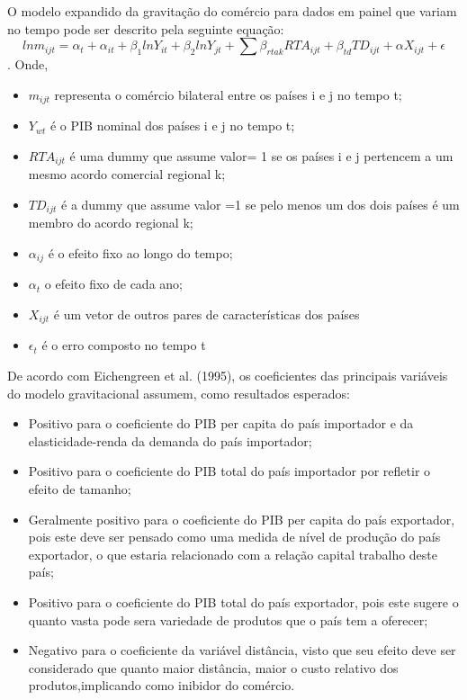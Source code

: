 \documentclass[12pt]{article}
\begin{document}
O modelo expandido da gravitação do comércio para dados em painel que variam no tempo pode ser descrito pela seguinte equação: \[ln m_{ijt} = \alpha_t + \alpha_{it} + \beta_1 ln Y_{it} + \beta_2 ln Y_{jt} + \sum{\beta_{rtak} RTA_{ijt} + \beta_{td} TD_{ijt}} + \alpha X_{ijt} + \epsilon\]. \linebreak Onde, 
\begin{itemize}
\item $m_{ijt}$ representa o comércio bilateral entre os países i e j no tempo t;
\item $Y_{wt}$ é o PIB nominal dos países i e j no tempo t;
\item $RTA_{ijt}$ é uma dummy que assume valor= 1 se os países i e j pertencem a um mesmo acordo comercial regional k;
\item $TD_{ijt}$ é a dummy que assume valor =1 se pelo menos um dos dois países é um membro do acordo regional k; 
\item $\alpha_{ij}$ é o efeito fixo ao longo do tempo;
\item $\alpha_t$ o efeito fixo de cada ano;
\item $X_{ijt}$ é um vetor de outros pares de características dos países
\item $\epsilon_t$ é o erro composto no tempo t
\end{itemize}

De acordo com Eichengreen et al. (1995), os coeficientes das principais variáveis do modelo gravitacional assumem, como resultados esperados:

\begin{itemize}
\item Positivo para o coeficiente do PIB per capita do país importador e da elasticidade-renda da demanda do país importador;
\item Positivo para o coeficiente do PIB total do país importador por refletir o efeito de tamanho;
\item Geralmente positivo para o coeficiente do PIB per capita do país exportador, pois este deve ser pensado como uma medida de nível de produção do país  exportador, o que estaria relacionado com a relação capital trabalho deste país;
\item Positivo para o coeficiente do PIB total do país exportador, pois este sugere o quanto vasta pode sera variedade de produtos que o país tem a oferecer;
\item Negativo para o coeficiente da variável distância, visto que seu efeito deve ser considerado que quanto maior distância, maior o custo relativo dos produtos,implicando como inibidor do comércio.
\end{itemize}
\end{document}
